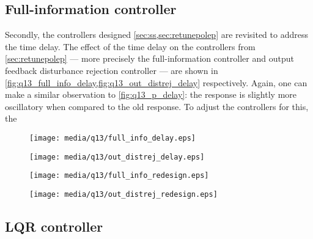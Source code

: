 \subsection{Full-information controller}
Secondly, the controllers designed \cref{sec:ss,sec:retunepolep} are revisited to address the time delay. The effect of the time delay on the controllers from \cref{sec:retunepolep} --- more precisely the full-information controller and output feedback disturbance rejection controller --- are shown in \cref{fig:q13_full_info_delay,fig:q13_out_distrej_delay} respectively. Again, one can make a similar observation to \cref{fig:q13_p_delay}: the response is slightly more oscillatory when compared to the old response. To adjust the controllers for this, the
\begin{figure}[ht]
    \centering
    \texttt{[image: media/q13/full\_info\_delay.eps]}
    \caption{}
    \label{fig:q13_full_info_delay}
\end{figure}
\begin{figure}[ht]
    \centering
    \texttt{[image: media/q13/out\_distrej\_delay.eps]}
    \caption{}
    \label{fig:q13_out_distrej_delay}
\end{figure}
\begin{figure}[ht]
    \centering
    \texttt{[image: media/q13/full\_info\_redesign.eps]}
    \caption{}
    \label{fig:q13_full_info_redesign}
\end{figure}
\begin{figure}[ht]
    \centering
    \texttt{[image: media/q13/out\_distrej\_redesign.eps]}
    \caption{}
    \label{fig:q13_out_distrej_redesign}
\end{figure}

\FloatBarrier
\subsection{LQR controller}